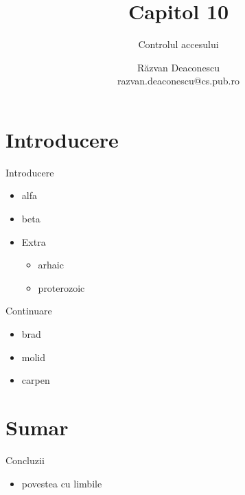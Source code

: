 \documentclass{training}
\title[Capitol 10]{Capitol 10}
\subtitle{Controlul accesului}
\author[Răzvan]{Răzvan Deaconescu\\razvan.deaconescu@cs.pub.ro}
\date{}
\begin{document}
\frame{\titlepage}

\frame{\tableofcontents}

\section{Introducere}

\begin{frame}{Introducere}
  \begin{itemize}
    \item alfa
    \item beta
    \item Extra
      \begin{itemize}
        \item arhaic
        \item proterozoic
      \end{itemize}
  \end{itemize}
\end{frame}

\begin{frame}{Continuare}
  \begin{itemize}
    \item brad
    \item molid
    \item carpen
  \end{itemize}
\end{frame}

\frame{\tableofcontents}

\section{Sumar}

\begin{frame}{Concluzii}
  \begin{itemize}
    \item povestea cu limbile
  \end{itemize}
\end{frame}
\end{document}
